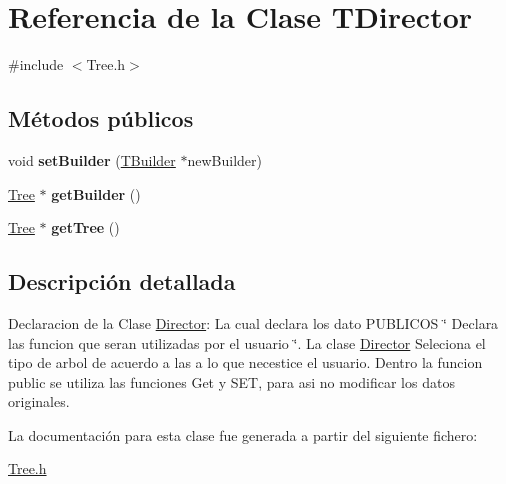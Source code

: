 \hypertarget{class_t_director}{}\section{Referencia de la Clase T\+Director}
\label{class_t_director}


{\ttfamily \#include $<$Tree.\+h$>$}

\subsection*{Métodos públicos}
\begin{DoxyCompactItemize}
\item 
\mbox{\label{class_t_director_a9dc2e7bc1a9fa5d9033ee4cc48c7ac3f}} 
void {\bfseries set\+Builder} (\mbox{\hyperlink{class_t_builder}{T\+Builder}} $\ast$new\+Builder)
\item 
\mbox{\label{class_t_director_aa2e7638eb6a1ba5977a5a1449d318496}} 
\mbox{\hyperlink{class_tree}{Tree}} $\ast$ {\bfseries get\+Builder} ()
\item 
\mbox{\label{class_t_director_aca5fe67cd7f33ebb8edc9c1e10ef7316}} 
\mbox{\hyperlink{class_tree}{Tree}} $\ast$ {\bfseries get\+Tree} ()
\end{DoxyCompactItemize}


\subsection{Descripción detallada}
Declaracion de la Clase \mbox{\hyperlink{class_director}{Director}}\+: La cual declara los dato P\+U\+B\+L\+I\+C\+OS \char`\"{} Declara las funcion que seran utilizadas por el usuario \char`\"{}. La clase \mbox{\hyperlink{class_director}{Director}} Seleciona el tipo de arbol de acuerdo a las a lo que necestice el usuario. Dentro la funcion public se utiliza las funciones Get y S\+ET, para asi no modificar los datos originales. 

La documentación para esta clase fue generada a partir del siguiente fichero\+:\begin{DoxyCompactItemize}
\item 
\mbox{\hyperlink{_tree_8h}{Tree.\+h}}\end{DoxyCompactItemize}
